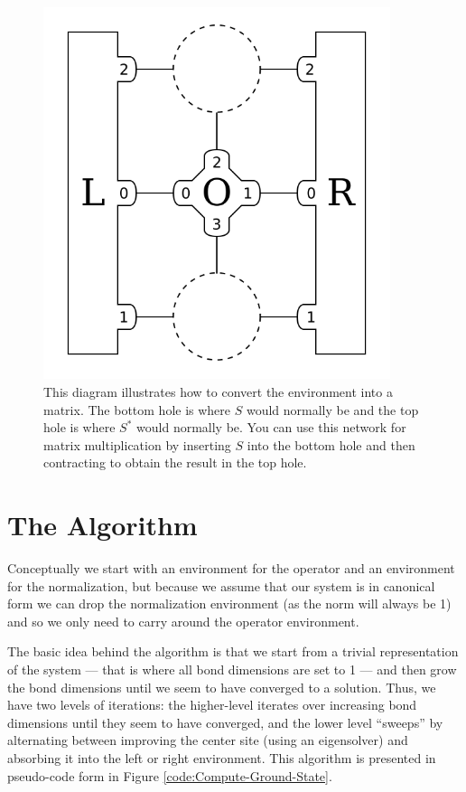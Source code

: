 \documentclass{article}
\newcommand{\diagramwidth}{4in}
\begin{document}
\begin{figure}\begin{center}
\includegraphics[width=\diagramwidth]{drawings/matmul-car}
\caption{\label{fig:matmul-car}This diagram illustrates how to convert the environment into a matrix.  The bottom hole is where $S$ would normally be and the top hole is where $S^*$ would normally be.  You can use this network for matrix multiplication by inserting $S$ into the bottom hole and then contracting to obtain the result in the top hole.}
\end{center}\end{figure}

\clearpage

\section{The Algorithm}

Conceptually we start with an environment for the operator and an environment for the normalization, but because we assume that our system is in canonical form we can drop the normalization environment (as the norm will always be 1) and so we only need to carry around the operator environment.

The basic idea behind the algorithm is that we start from a trivial representation of the system --- that is where all bond dimensions are set to 1 --- and then grow the bond dimensions until we seem to have converged to a solution.  Thus, we have two levels of iterations:  the higher-level iterates over increasing bond dimensions until they seem to have converged, and the lower level ``sweeps'' by alternating between improving the center site (using an eigensolver) and absorbing it into the left or right environment.  This algorithm is presented in pseudo-code form in Figure \ref{code:Compute-Ground-State}.
\end{document}

